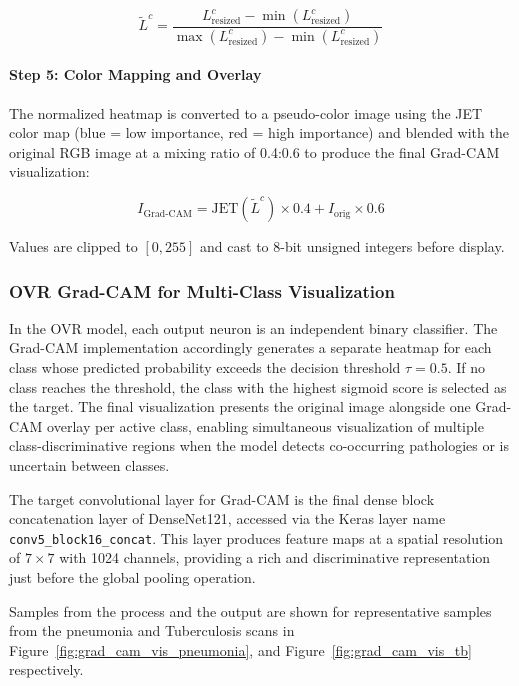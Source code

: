 \begin{equation}
	\tilde{L}^c =
	\frac{L_{\mathrm{resized}}^c - \min(L_{\mathrm{resized}}^c)}
	{\max(L_{\mathrm{resized}}^c) - \min(L_{\mathrm{resized}}^c)}
	\label{eq:gradcam_normalization}
\end{equation}

\paragraph{Step 5: Color Mapping and Overlay}
The normalized heatmap is converted to a pseudo-color image using the JET color map (blue = low importance, red = high importance) and blended with the original RGB image at a mixing ratio of 0.4:0.6 to produce the final Grad-CAM visualization:

\begin{equation}
	I_{\mathrm{Grad\text{-}CAM}} =
	\mathrm{JET}(\tilde{L}^c)\times 0.4 + I_{\mathrm{orig}} \times 0.6
	\label{eq:gradcam_final}
\end{equation}

Values are clipped to $[0,255]$ and cast to 8-bit unsigned integers before display.

\subsubsection{OVR Grad-CAM for Multi-Class Visualization}
In the OVR model, each output neuron is an independent binary classifier. The Grad-CAM implementation accordingly generates a separate heatmap for each class whose predicted probability exceeds the decision threshold $\tau = 0.5$. If no class reaches the threshold, the class with the highest sigmoid score is selected as the target. The final visualization presents the original image alongside one Grad-CAM overlay per active class, enabling simultaneous visualization of multiple class-discriminative regions when the model detects co-occurring pathologies or is uncertain between classes.

The target convolutional layer for Grad-CAM is the final dense block concatenation layer of DenseNet121, accessed via the Keras layer name \texttt{conv5\_block16\_concat}. This layer produces feature maps at a spatial resolution of $7 \times 7$ with 1024 channels, providing a rich and discriminative representation just before the global pooling operation.

Samples from the process and the output are shown for representative samples from the pneumonia and Tuberculosis scans in Figure~\ref{fig:grad_cam_vis_pneumonia}, and Figure~\ref{fig:grad_cam_vis_tb} respectively.


